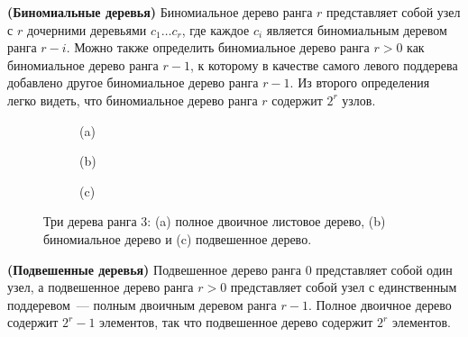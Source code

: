 \begin{frame}[fragile]{}
\begin{definition}
  \textbf{(Биномиальные деревья)} Биномиальное дерево ранга $r$
  представляет собой узел с $r$ дочерними деревьями $c_1 \ldots c_r$,
  где каждое $c_i$ является биномиальным деревом ранга $r -
  i$. Можно также определить биномиальное дерево ранга $r > 0$ как
  биномиальное дерево ранга $r - 1$, к которому в качестве самого
  левого поддерева добавлено другое биномиальное дерево ранга $r -
  1$. Из второго определения легко видеть, что биномиальное дерево
  ранга $r$ содержит $2^r$ узлов.
\end{definition}

\end{frame}

\begin{frame}[fragile]{}
\begin{figure}
  \begin{subfigure}[b]{0.3\textwidth}
    \centering
    \par\vspace{0.2cm}
    (a)
  \end{subfigure}
  \begin{subfigure}[b]{0.3\textwidth}
    \centering
    \par\vspace{0.2cm}
    (b)
  \end{subfigure}
  \begin{subfigure}[b]{0.3\textwidth}
    \centering
    \par\vspace{0.2cm}
    (c)
  \end{subfigure}
  \caption{Три дерева ранга 3: (a) полное двоичное листовое дерево,
    (b) биномиальное дерево и (c) подвешенное дерево.}
  \label{fig:9.2}
\end{figure}
\begin{definition}
  \textbf{(Подвешенные деревья)} Подвешенное дерево ранга 0 представляет собой один узел, а
  подвешенное дерево ранга $r > 0$ представляет собой узел с единственным
  поддеревом~--- полным двоичным деревом ранга $r - 1$. Полное
  двоичное дерево содержит $2^r - 1$ элементов, так что подвешенное дерево
  содержит $2^r$ элементов.
\end{definition}

\end{frame}

